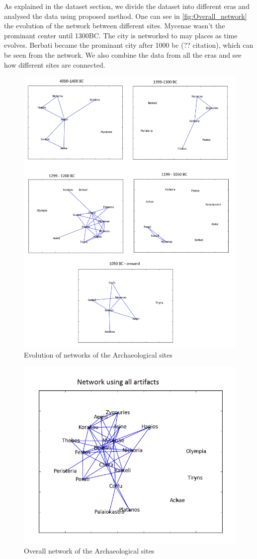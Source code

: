   
As explained in the dataset section, we divide the dataset into different eras and analysed the data using proposed method. One can see in \ref{fig:Overall_network} the evolution of the network between different sites. Mycenae wasn't the prominant center until 1300BC. The city is networked to may places as time evolves. Berbati became the prominant city after 1000 bc (?? citation), which can be seen from the network.
We also combine the data from all the eras and see how different sites are connected. 


\begin{figure}
\includegraphics[width=\textwidth]{Network_evolution.png}
\caption{Evolution of networks of the Archaeological sites}
\end{figure}


\begin{figure}
\includegraphics[width=\textwidth]{Overall_Network.png}
\caption{Overall network of the Archaeological sites}
\end{figure}
